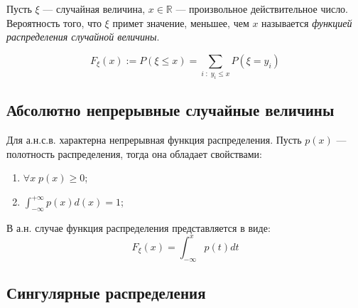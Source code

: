 \begin{definition}
Пусть $\xi$ --- случайная величина, $x \in \mathbb{R}$ --- произвольное действительное число. Вероятность того, что $\xi$ примет значение, меньшее, чем $x$ называется \textit{функцией распределения случайной величины}.

\begin{equation}
    F_\xi (x) := P(\xi \leq x) = \sum_{i \; : \; y_i \leq x} P(\xi=y_i)
\end{equation}

\end{definition}

\subsection{Абсолютно непрерывные случайные величины}

Для а.н.с.в. характерна непрерывная функция распределения. Пусть $p(x)$ --- полотность распределения, тогда она обладает свойствами:
\begin{enumerate}
    \item $\forall x \; p(x) \geq 0$;
    \item $\int_{-\infty}^{+\infty} p(x) d(x) =1$;
\end{enumerate}

В а.н. случае функция распределения представляется в виде:
\begin{equation}
    F_\xi(x) = \int_{-\infty}^x p(t) dt
\end{equation}

\subsection{Сингулярные распределения}

\newpage